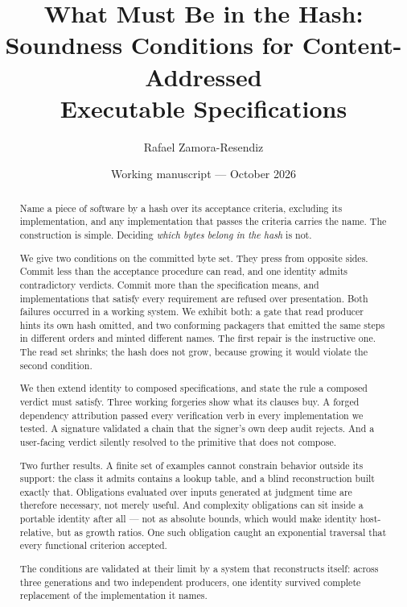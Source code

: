 \documentclass[10pt,twocolumn,letterpaper]{article}
\title{What Must Be in the Hash:\\Soundness Conditions for Content-Addressed\\Executable Specifications}
\author{Rafael Zamora-Resendiz}
\date{Working manuscript --- October 2026}
\begin{document}
\maketitle

\begin{abstract}
Name a piece of software by a hash over its acceptance criteria, excluding its implementation, and any implementation that passes the criteria carries the name. The construction is simple. Deciding \emph{which bytes belong in the hash} is not.

We give two conditions on the committed byte set. They press from opposite sides. Commit less than the acceptance procedure can read, and one identity admits contradictory verdicts. Commit more than the specification means, and implementations that satisfy every requirement are refused over presentation. Both failures occurred in a working system. We exhibit both: a gate that read producer hints its own hash omitted, and two conforming packagers that emitted the same steps in different orders and minted different names. The first repair is the instructive one. The read set shrinks; the hash does not grow, because growing it would violate the second condition.

We then extend identity to composed specifications, and state the rule a composed verdict must satisfy. Three working forgeries show what its clauses buy. A forged dependency attribution passed every verification verb in every implementation we tested. A signature validated a chain that the signer's own deep audit rejects. And a user-facing verdict silently resolved to the primitive that does not compose.

Two further results. A finite set of examples cannot constrain behavior outside its support: the class it admits contains a lookup table, and a blind reconstruction built exactly that. Obligations evaluated over inputs generated at judgment time are therefore necessary, not merely useful. And complexity obligations can sit inside a portable identity after all --- not as absolute bounds, which would make identity host-relative, but as growth ratios. One such obligation caught an exponential traversal that every functional criterion accepted.

The conditions are validated at their limit by a system that reconstructs itself: across three generations and two independent producers, one identity survived complete replacement of the implementation it names.
\end{abstract}
\end{document}
